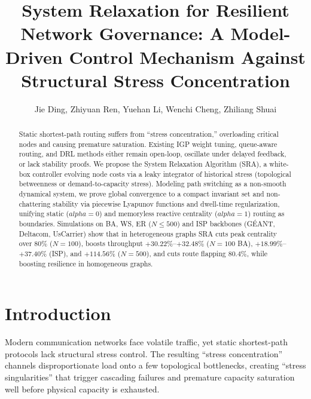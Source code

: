 \documentclass{ccjnl}
\title{System Relaxation for Resilient Network Governance: A Model-Driven Control Mechanism Against Structural Stress Concentration}
\author{Jie Ding\inst{1}, Zhiyuan Ren\inst{2,*}, Yuehan Li\inst{2}, Wenchi Cheng\inst{2}, Zhiliang Shuai\inst{2}\corinfo{zyren@xidian.edu.cn}}
\newcommand{\rev}[1]{{\color{blue}#1}}
\def\rev#1{#1}%
\def\alpha{alpha}%
\begin{document}
\maketitle

\begin{abstract}
Static shortest-path routing suffers from ``stress concentration,'' overloading critical nodes and causing premature saturation. \rev{Existing IGP weight tuning, queue-aware routing, and DRL methods either remain open-loop, oscillate under delayed feedback, or lack stability proofs.} We propose the System Relaxation Algorithm (SRA), a white-box controller evolving node costs via a leaky integrator of historical stress \rev{(topological betweenness or demand-to-capacity stress)}. Modeling path switching as a non-smooth dynamical system, we prove \rev{global convergence to a compact invariant set} and non-chattering stability via piecewise Lyapunov functions \rev{and dwell-time regularization}, unifying static \rev{($\alpha=0$) and memoryless reactive centrality ($\alpha=1$)} routing as boundaries. Simulations on \rev{BA, WS, ER ($N \le 500$) and ISP backbones (G\'EANT, Deltacom, UsCarrier)} show that in heterogeneous graphs SRA cuts peak centrality over $80\%$ \rev{($N=100$)}, boosts throughput \rev{$+30.22\%$--$+32.48\%$ ($N=100$ BA), $+18.99\%$--$+37.40\%$ (ISP), and $+114.56\%$ ($N=500$)}, and cuts route flapping \rev{$80.4\%$}, while boosting resilience in homogeneous graphs.
\end{abstract}




\section{Introduction}
\label{sec:introduction}

Modern communication networks face volatile traffic, yet static shortest-path protocols lack structural stress control. The resulting ``stress concentration'' channels disproportionate load onto a few topological bottlenecks, creating ``stress singularities'' that trigger cascading failures and premature capacity saturation well before physical capacity is exhausted.
\end{document}
